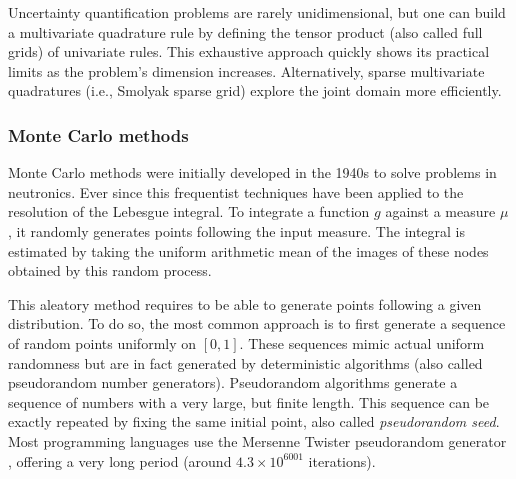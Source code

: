 Uncertainty quantification problems are rarely unidimensional, but one can build a multivariate quadrature rule by defining the tensor product (also called full grids) of univariate rules. 
This exhaustive approach quickly shows its practical limits as the problem's dimension increases. 
Alternatively, sparse multivariate quadratures (i.e., Smolyak sparse grid) explore the joint domain more efficiently. 



\subsubsection{Monte Carlo methods}
Monte Carlo methods were initially developed in the 1940s to solve problems in neutronics.  
Ever since this frequentist techniques have been applied to the resolution of the Lebesgue integral. 
To integrate a function $g$ against a measure $\mu$, it randomly generates points following the input measure. 
The integral is estimated by taking the uniform arithmetic mean of the images of these nodes obtained by this random process. 

This aleatory method requires to be able to generate points following a given distribution. 
To do so, the most common approach is to first generate a sequence of random points uniformly on $[0, 1]$. 
These sequences mimic actual uniform randomness but are in fact generated by deterministic algorithms (also called pseudorandom number generators).
Pseudorandom algorithms generate a sequence of numbers with a very large, but finite length. 
This sequence can be exactly repeated by fixing the same initial point, also called \textit{pseudorandom seed}.
Most programming languages use the Mersenne Twister pseudorandom generator \citep{matsumoto_1998}, offering a very long period (around $4.3\times10^{6001}$ iterations).

